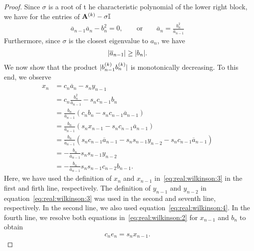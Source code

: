 \begin{proof}
  Since $\sigma$ is a root of t he characteristic polynomial of the
  lower right block, we have for the entries of $\mathbf A^{(k)}-\sigma\mathbb I$
  \begin{gather}
    \label{eq:real:wilkinson:4}
    \overline a_{n-1}\overline a_n - b_n^2 = 0,
    \qquad\text{or}\qquad
    \overline a_n = \frac{b_n^2}{\overline a_{n-1}}
  \end{gather}
  Furthermore, since $\sigma$ is the closest eigenvalue to $a_n$, we have
  \begin{gather}
    \label{eq:real:wilkinson:10}
    \lvert\overline a_{n-1}\rvert \ge \lvert b_n\rvert.
  \end{gather}
  We now show that the product $\lvert b_{n-1}^{(k)}b_{n}^{(k)}\rvert$ is
  monotonically decreasing. To this end, we observe
  \begin{align}
    x_n
    &= c_n \overline a_n - s_n y_{n-1}\\
    &= c_n\frac{b_n^2}{\overline a_{n-1}} - s_n c_{n-1} b_n\\
    &= \frac{b_n}{\overline a_{n-1}}
      \left(c_n b_n - s_n c_{n-1} \overline a_{n-1}\right)\\
    &= \frac{b_n}{\overline a_{n-1}}
      \left(s_n x_{n-1} - s_n c_{n-1} \overline a_{n-1}\right)\\
    &= \frac{b_n}{\overline a_{n-1}}
      \left(s_n c_{n-1} \overline a_{n-1} - s_n s_{n-1}y_{n-2}
      - s_n c_{n-1} \overline a_{n-1}\right)\\
    &= - \frac{b_n}{\overline a_{n-1}} s_n s_{n-1}y_{n-2}\\
    &= - \frac{b_n}{\overline a_{n-1}} s_n s_{n-1} c_{n-2} b_{n-1}.
  \end{align}
  Here, we have used the definition of $x_n$ and $x_{n-1}$
  in~\eqref{eq:real:wilkinson:3} in the first and firth line,
  respectively. The definition of $y_{n-1}$ and $y_{n-2}$ in
  equation~\eqref{eq:real:wilkinson:3} was used in the second and
  seventh line, respectively.  In the second line, we also used
  equation~\eqref{eq:real:wilkinson:4}. In the fourth line, we resolve
  both equations in~\eqref{eq:real:wilkinson:2} for $x_{n-1}$ and
  $b_n$ to obtain
  \begin{gather}
    c_n e_n = s_n x_{n-1}.
  \end{gather}


\end{proof}

